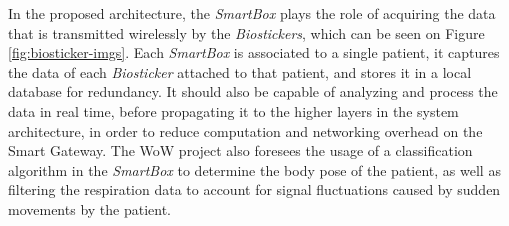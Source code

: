 
In the proposed architecture, the \textit{SmartBox} plays the role of acquiring the data that is transmitted wirelessly by the \textit{Biostickers}, which can be seen on Figure \ref{fig:biosticker-imgs}.
Each \textit{SmartBox} is associated to a single patient, it captures the data of each \textit{Biosticker} attached to that patient, and stores it in a local database for redundancy. 
It should also be capable of analyzing and process the data in real time, before propagating it to the higher layers in the system architecture, in order to reduce computation and networking overhead on the Smart Gateway. The \acs{WoW} project also foresees the usage of a classification algorithm in the \textit{SmartBox} to determine the body pose of the patient, as well as filtering the respiration data to account for signal fluctuations caused by sudden movements by the patient.  

